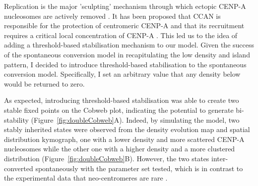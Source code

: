 Replication is the major 'sculpting' mechanism through which ectopic CENP-A nucleosomes are actively removed \citep{Nechemia-Arbely2019, Wang2021PhosphorylationCycle}. It has been proposed that CCAN is responsible for the protection of centromeric CENP-A and that its recruitment requires a critical local concentration of CENP-A \citep{Nechemia-Arbely2019, Bodor2014}. This led us to the idea of adding a threshold-based stabilisation mechanism to our model. Given the success of the spontaneous conversion model in recapitulating the low density and island pattern, I decided to introduce threshold-based stabilisation to the spontaneous conversion model. Specifically, I set an arbitrary value that any density below would be returned to zero. 

As expected, introducing threshold-based stabilisation was able to create two stable fixed points on the Cobweb plot, indicating the potential to generate bi-stability (Figure~\ref{fig:doubleCobweb}A). Indeed, by simulating the model, two stably inherited states were observed from the density evolution map and spatial distribution kymograph, one with a lower density and more scattered CENP-A nucleosomes while the other one with a higher density and a more clustered distribution (Figure~\ref{fig:doubleCobweb}B). However, the two states inter-converted spontaneously with the parameter set tested, which is in contrast to the experimental data that neo-centromeres are rare \citep{Marshall2008Neocentromeres:Evolution}. 

